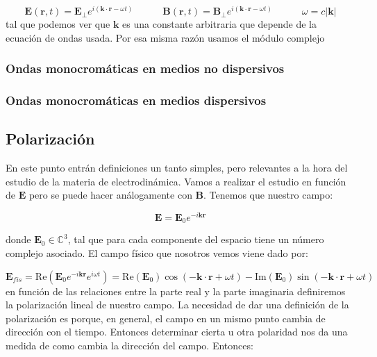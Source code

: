 \documentclass[12pt,a4paper]{article}
\newcommand{\parentesis}[1]{\left( #1  \right)}
\newcommand{\Real}{\mathrm{Re}}
\newcommand{\Imaginario}{\mathrm{Im}}
\newcommand{\tquad}{\quad \quad \quad}
\newcommand{\Bn}{\mathbf{B}}
\newcommand{\En}{\mathbf{E}}
\newcommand{\kn}{\mathbf{k}}
\newcommand{\rn}{\mathbf{r}}
\numberwithin{equation}{section}
\numberwithin{figure}{section}
\begin{document}
\begin{equation}
\En (\rn,t) = \En_\perp e^{i (\kn \cdot \rn - \omega t)}  \tquad \Bn (\rn,t) = \Bn_\perp e^{i (\kn \cdot \rn - \omega t)} \tquad \omega = c |\kn|
\end{equation}
tal que podemos ver que $\kn$ es una constante arbitraria que depende de la ecuación de ondas usada. Por esa misma razón usamos el módulo complejo

\subsubsection{Ondas monocromáticas en medios no dispersivos}

\subsubsection{Ondas monocromáticas en medios  dispersivos}
\newpage



\subsection{Polarización}

En este punto entrán definiciones un tanto simples, pero relevantes a la hora del estudio de la materia de electrodinámica. Vamos a realizar el estudio en función de $\En$ pero se puede hacer análogamente con $\Bn$. Tenemos que nuestro campo:

\begin{equation}
\En =  \En_0 e^{-i \kn \rn}
\end{equation}

donde $\En_0 \in \mathbb{C}^3$, tal que para cada componente del espacio tiene un número complejo asociado. El campo físico que nosotros vemos viene dado por:

\begin{equation}
\En_{fis} = \Real \parentesis{\En_0 e^{-i \kn \rn} e^{i \omega t}} = \Real (\En_0) \cos (- \kn \cdot \rn + \omega t) - \Imaginario (\En_0) \sin (- \kn \cdot \rn + \omega t)
\end{equation}
en función de las relaciones entre la parte real y la parte imaginaria definiremos la polarización lineal de nuestro campo. La necesidad de dar una definición de la polarización es porque, en general, el campo en un mismo punto cambia de dirección con el tiempo. Entonces determinar cierta u otra polaridad nos da una medida de como cambia la dirección del campo. Entonces:
\end{document}
